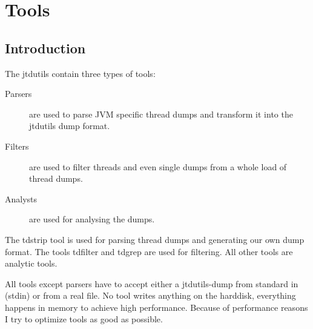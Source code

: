 \section{Tools}

\subsection{Introduction}

The jtdutils contain three types of tools:
\begin{description}
\item[Parsers] are used to parse JVM specific thread dumps and transform it into the jtdutils dump format.
\item[Filters] are used to filter threads and even single dumps from a whole load of thread dumps.
\item[Analysts] are used for analysing the dumps. 
\end{description}

The tdstrip tool is used for parsing thread dumps and generating our own dump format.
The tools tdfilter and tdgrep are used for filtering.
All other tools are analytic tools.

All tools except parsers have to accept either a jtdutils-dump from standard in (stdin) or from a real file.
No tool writes anything on the harddisk, everything happens in memory to achieve high performance.
Because of performance reasons I try to optimize tools as good as possible.